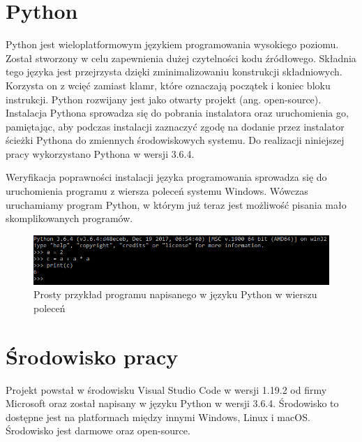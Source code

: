 \section{Python}
Python jest wieloplatformowym językiem programowania wysokiego poziomu. Został stworzony w celu zapewnienia dużej czytelności kodu źródłowego. Składnia tego języka jest przejrzysta dzięki zminimalizowaniu konstrukcji składniowych. Korzysta on z wcięć zamiast klamr, które oznaczają początek i koniec bloku instrukcji. Python rozwijany jest jako otwarty projekt (ang. open-source). Instalacja Pythona sprowadza się do pobrania instalatora oraz uruchomienia go, pamiętając, aby podczas instalacji zaznaczyć zgodę na dodanie przez instalator ścieżki Pythona do zmiennych środowiskowych systemu. Do realizacji niniejszej pracy wykorzystano Pythona w wersji 3.6.4.


Weryfikacja poprawności instalacji języka programowania sprowadza się do uruchomienia programu z wiersza poleceń systemu Windows. Wówczas uruchamiamy program Python, w którym już teraz jest możliwość pisania mało skomplikowanych programów.

\begin{figure}[h!]
    \centering
    \includegraphics[scale=0.7]{Rysunki/Rozdzial2/5.png}
    \caption{Prosty przykład programu napisanego w języku Python w wierszu poleceń}
    \label{fig:simplePythonCmd}
\end{figure}

\section{Środowisko pracy}
Projekt powstał w środowisku Visual Studio Code w wersji 1.19.2 od firmy Microsoft oraz został napisany w języku Python w wersji 3.6.4. Środowisko to dostępne jest na platformach między innymi Windows, Linux i macOS. Środowisko jest darmowe oraz open-source.


